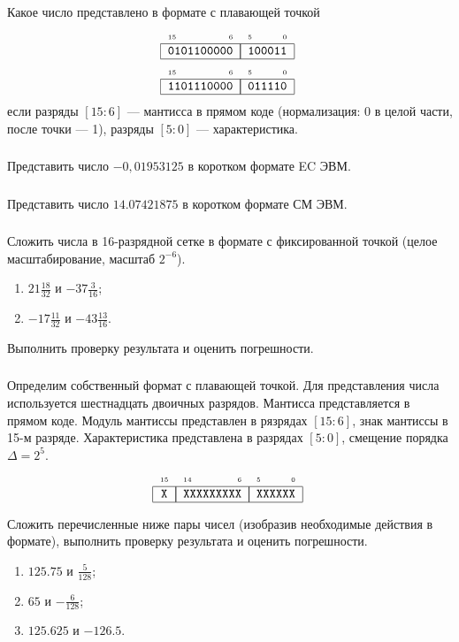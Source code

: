 \begin{frame}
    \frametitle{\TaskSimpleNumber}
    
    Какое число представлено в формате с плавающей точкой
    \begin{align*}
        \FloatMySimpleHex{0101100000}{100011}\\
        \FloatMySimpleHex{1101110000}{011110}
    \end{align*}
    если разряды $[15:6]$ --- мантисса в прямом коде (нормализация: 0 в целой части, после точки --- 1), разряды $[5:0]$ --- характеристика.
\end{frame}
        
\begin{frame}
    \frametitle{\TaskSimpleNumber}
    Представить число $-0,01953125$ в коротком формате EC ЭВМ.
\end{frame}
        
\begin{frame}
    \frametitle{\TaskSimpleNumber}
    Представить число $14.07421875$ в коротком формате СМ ЭВМ.
\end{frame}
        
\begin{frame}
    \frametitle{\TaskSimpleNumber}
    
    Сложить числа в 16-разрядной сетке в формате с фиксированной точкой (целое масштабирование, масштаб $2^{-6}$).
    \begin{enumerate}
        \item $21\frac{18}{32}$ и $-37\frac{3}{16}$;
        \item $-17\frac{11}{32}$ и $-43\frac{13}{16}$.
    \end{enumerate}
    Выполнить проверку результата и оценить погрешности.
\end{frame}

\begin{frame}
    \frametitle{\TaskSimpleNumber}
    
    Определим собственный формат с плавающей точкой. Для представления числа используется шестнадцать двоичных разрядов. Мантисса представляется в прямом коде. Модуль мантиссы представлен в рязрядах $[15:6]$, знак мантиссы в 15-м разряде. Характеристика представлена в разрядах $[5:0]$, смещение порядка $\Delta=2^5$.
    \[
        \FloatMyCharHex{X}{XXXXXXXXX}{XXXXXX}
    \]

    Сложить перечисленные ниже пары чисел (изобразив необходимые действия в формате), выполнить проверку результата и оценить погрешности.
    \begin{enumerate}
        \item $125.75$ и $\frac{5}{128}$;
        \item $65$ и $-\frac{6}{128}$;
        \item $125.625$ и $-126.5$.
    \end{enumerate}
\end{frame}


